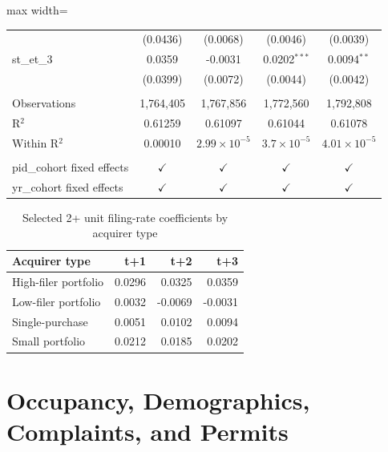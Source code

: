 \documentclass[
  11pt,
]{article}
\begin{document}
\begin{adjustbox}{max width=\textwidth}
\begin{tabular}{lcccc}
                              & (0.0436)             & (0.0068)              & (0.0046)             & (0.0039)\\   
   st\_et\_3                  & 0.0359               & -0.0031               & 0.0202$^{***}$       & 0.0094$^{**}$\\   
                              & (0.0399)             & (0.0072)              & (0.0044)             & (0.0042)\\   
    \\
   Observations               & 1,764,405            & 1,767,856             & 1,772,560            & 1,792,808\\  
   R$^2$                      & 0.61259              & 0.61097               & 0.61044              & 0.61078\\  
   Within R$^2$               & 0.00010              & $2.99\times 10^{-5}$  & $3.7\times 10^{-5}$  & $4.01\times 10^{-5}$\\   
    \\
   pid\_cohort fixed effects  & $\checkmark$         & $\checkmark$          & $\checkmark$         & $\checkmark$\\   
   yr\_cohort fixed effects   & $\checkmark$         & $\checkmark$          & $\checkmark$         & $\checkmark$\\   
   \bottomrule
\end{tabular}
\par\endgroup



\end{adjustbox}

\begin{longtable}[t]{lrrr}
\caption{\label{tab:filing-acq-summary}Selected 2+ unit filing-rate coefficients by acquirer type}\\
\toprule
Acquirer type & t+1 & t+2 & t+3\\
\midrule
High-filer portfolio & 0.0296 & 0.0325 & 0.0359\\
Low-filer portfolio & 0.0032 & -0.0069 & -0.0031\\
Single-purchase & 0.0051 & 0.0102 & 0.0094\\
Small portfolio & 0.0212 & 0.0185 & 0.0202\\
\bottomrule
\end{longtable}

\section{Occupancy, Demographics, Complaints, and
Permits}\label{occupancy-demographics-complaints-and-permits}
\end{document}
